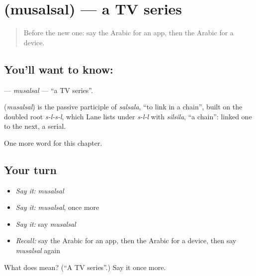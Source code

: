 \section[\texorpdfstring{\ar{مسلسل} (musalsal)}{مسلسل (musalsal)}]{ (musalsal) — a TV series}

\label{lesson:AR-C248-musalsal}



\begin{quote}
Before the new one: say the Arabic for an app, then the Arabic for a device.
\end{quote}

\subsection*{You'll want to know: }
\textbf{} — \emph{musalsal} — \textquotedblleft{}a TV series\textquotedblright{}.

\begin{cousinweb}
\textbf{} (\emph{musalsal}) is the passive participle of \emph{salsala}, \textquotedblleft{}to link in a chain\textquotedblright{}, built on the doubled root \emph{s-l-s-l}, which Lane lists under \emph{s-l-l} with \emph{silsila}, \textquotedblleft{}a chain\textquotedblright{}: linked one to the next, a serial.
\end{cousinweb}

\begin{grammarlens}[title={What you've built}]
One more word for this chapter.
\end{grammarlens}

\subsection*{Your turn}
\begin{itemize}
\raggedright
  \item \emph{Say it:} \emph{musalsal}
  \item \emph{Say it:} \emph{musalsal}, once more
  \item \emph{Say it:} say \emph{musalsal}
  \item \emph{Recall:} say the Arabic for an app, then the Arabic for a device, then say \emph{musalsal} again
\end{itemize}

\begin{tcolorbox}[breakable,colback=teal!4,colframe=teal!35!black,title={Before you move on}]
What does  mean? (\textquotedblleft{}A TV series\textquotedblright{}.) Say it once more.
\end{tcolorbox}
